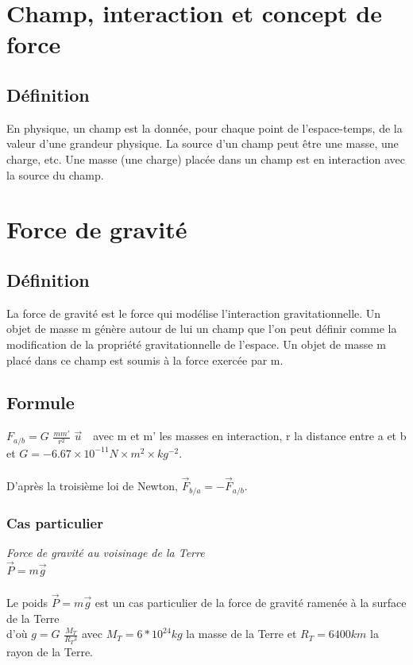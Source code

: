 \documentclass[a4paper,10pt]{book}
\begin{document}
\section{Champ, interaction et concept de force}
\subsection*{Définition}
En physique, un champ est la donnée, pour chaque point de l’espace-temps, de la valeur d’une grandeur physique. La source d’un champ peut être une masse, une charge, etc. Une masse (une charge) placée dans un champ est en interaction avec la source du champ.

\section{Force de gravité}
\subsection{Définition}
La force de gravité est le force qui modélise l’interaction gravitationnelle. Un objet de masse m génère autour de lui un champ que l’on peut définir comme la modification de la propriété gravitationnelle de l’espace. Un objet de masse m placé dans ce champ est soumis à la force exercée par m.

\subsection{Formule}
$F_{a/b}=G$ $\frac{mm'}{r^{2}}$ $\vec{u}$ $ $ $ $ avec m et m' les masses en interaction, r la distance entre a et b et $G=-6.67\times 10^{-11} N\times m^{2}\times kg^{-2}$.\\\\
D'après la troisième loi de Newton, $\vec{F}_{b/a}=-\vec{F}_{a/b}$.\\

\subsubsection{Cas particulier}
\emph{Force de gravité au voisinage de la Terre}\\

$\vec{P}=m\vec{g}$\\\\
Le poids $\vec{P}=m\vec{g}$ est un cas particulier de la force de gravité ramenée à la surface de la Terre\\
d'où $g=G$ $\frac{M_{T}}{R_{T}{}^{2}}$ $ $avec $M_{T}=6*10^{24} kg$ la masse de la Terre et $R_{T}=6400 km$ la rayon de la Terre.\\
\end{document}
